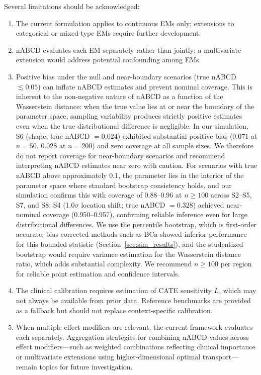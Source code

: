 \documentclass[AMA,Times1COL]{WileyNJDv5}
\begin{document}
Several limitations should be acknowledged:
\begin{enumerate}[1.]
\item The current formulation applies to continuous EMs only; extensions to categorical or mixed-type EMs require further development.
\item nABCD evaluates each EM separately rather than jointly; a multivariate extension would address potential confounding among EMs.
\item Positive bias under the null and near-boundary scenarios (true nABCD $\lesssim 0.05$) can inflate nABCD estimates and prevent nominal coverage. This is inherent to the non-negative nature of nABCD as a function of the Wasserstein distance: when the true value lies at or near the boundary of the parameter space, sampling variability produces strictly positive estimates even when the true distributional difference is negligible.\cite{andrews2000} In our simulation, S6 (shape; true nABCD $= 0.024$) exhibited substantial positive bias (0.071 at $n=50$, 0.028 at $n=200$) and zero coverage at all sample sizes. We therefore do not report coverage for near-boundary scenarios and recommend interpreting nABCD estimates near zero with caution. For scenarios with true nABCD above approximately 0.1, the parameter lies in the interior of the parameter space where standard bootstrap consistency holds, and our simulation confirms this with coverage of 0.88--0.96 at $n \geq 100$ across S2--S5, S7, and S8; S4 (1.0$\sigma$ location shift; true nABCD $= 0.328$) achieved near-nominal coverage (0.950--0.957), confirming reliable inference even for large distributional differences. We use the percentile bootstrap, which is first-order accurate; bias-corrected methods such as BCa showed inferior performance for this bounded statistic (Section~\ref{sec:sim_results}), and the studentized bootstrap would require variance estimation for the Wasserstein distance ratio, which adds substantial complexity. We recommend $n \geq 100$ per region for reliable point estimation and confidence intervals.
\item The clinical calibration requires estimation of CATE sensitivity $L$, which may not always be available from prior data. Reference benchmarks are provided as a fallback but should not replace context-specific calibration.
\item When multiple effect modifiers are relevant, the current framework evaluates each separately. Aggregation strategies for combining nABCD values across effect modifiers---such as weighted combinations reflecting clinical importance or multivariate extensions using higher-dimensional optimal transport---remain topics for future investigation.

\end{enumerate}
\end{document}
